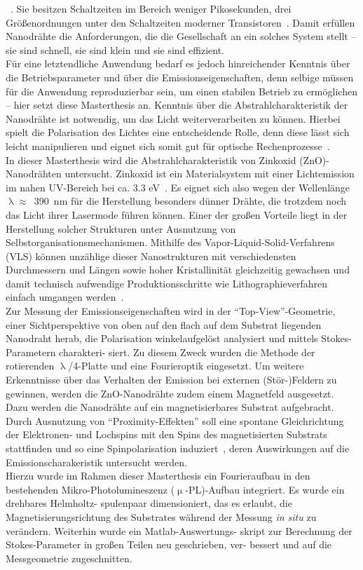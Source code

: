 ~\cite{Eichhorn.2013}. Sie besitzen Schaltzeiten im Bereich weniger Pikosekunden,
drei Größenordnungen unter den Schaltzeiten moderner Transistoren~\cite{Sidiropoulos.2014,Qiu.2017}. Damit erfüllen Nanodrähte die Anforderungen,
die die Gesellschaft an ein solches System stellt – sie sind schnell, sie sind
klein und sie sind effizient.\\ Für eine letztendliche Anwendung bedarf es
jedoch hinreichender Kenntnis über die Betriebsparameter und über die
Emissionseigenschaften, denn selbige müssen für die Anwendung reproduzierbar
sein, um einen stabilen Betrieb zu ermöglichen – hier setzt diese Masterthesis
an. Kenntnis über die Abstrahlcharakteristik der Nanodrähte ist notwendig, um
das Licht weiterverarbeiten zu können. Hierbei spielt die Polarisation des
Lichtes eine entscheidende Rolle, denn diese lässt sich leicht manipulieren und
eignet sich somit gut für optische Rechenprozesse~\cite{Lohmann.1986}.\\ In
dieser Masterthesis wird die Abstrahlcharakteristik von Zinkoxid
(ZnO)-Nanodrähten untersucht. Zinkoxid ist ein Materialsystem mit einer
Lichtemission im nahen UV-Bereich bei ca. 3.3 eV~\cite{Srikant.1998}. Es eignet
sich also wegen der Wellenlänge \mbox{$\uplambda\approx$ 390 nm} für die
Herstellung besonders dünner Drähte, die trotzdem noch das Licht ihrer Lasermode
führen können. Einer der großen Vorteile liegt in der Herstellung solcher
Strukturen unter Ausnutzung von Selbstorganisationsmechanismen. Mithilfe des
Vapor-Liquid-Solid-Verfahrens (VLS) können unzählige dieser Nanostrukturen mit
verschiedensten Durchmessern und Längen sowie hoher Kristallinität gleichzeitig
gewachsen und damit technisch aufwendige Produktionsschritte wie
Lithographieverfahren einfach \mbox{umgangen} werden~\cite{Roeder.Diss}.\\ Zur
Messung der Emissionseigenschaften wird in der ``Top-View''-Geometrie, einer
Sichtperspektive von oben auf den flach auf dem Substrat liegenden Nanodraht
herab, die Polarisation winkelaufgelöst analysiert und mittels Stokes-Parametern
charakteri- siert. Zu diesem Zweck wurden die Methode der rotierenden
$\uplambda$/4-Platte und eine Fourieroptik eingesetzt. Um weitere Erkenntnisse
über das Verhalten der Emission bei externen (Stör-)Feldern zu gewinnen, werden
die ZnO-Nanodrähte zudem einem Magnetfeld ausgesetzt. Dazu werden die Nanodrähte
auf ein magnetisierbares Substrat \mbox{aufgebracht}. Durch Ausnutzung von
``Proximity-Effekten'' soll eine spontane Gleichrichtung der Elektronen- und
Lochspins mit den Spins des \mbox{magnetisierten} Substrats stattfinden und so
eine Spinpolarisation induziert~\cite{Epstein.2002}, deren Auswirkungen auf die
Emissionscharakeristik untersucht werden.\\ Hierzu wurde im Rahmen dieser
Masterthesis ein Fourieraufbau in den \mbox{bestehenden} Mikro-Photolumineszenz
($\upmu$-PL)-Aufbau integriert. Es wurde ein drehbares Helmholtz- spulenpaar
dimensioniert, das es erlaubt, die Magnetisierungsrichtung des Substrates
während der Messung \textit{in situ} zu verändern. Weiterhin wurde ein
Matlab-Auswertungs- skript zur Berechnung der Stokes-Parameter in großen Teilen
neu geschrieben, ver- bessert und auf die Messgeometrie zugeschnitten.
